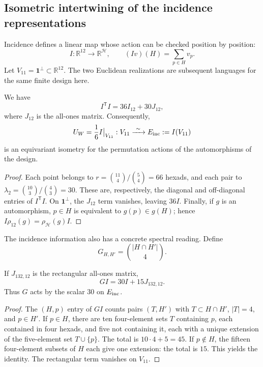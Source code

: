 

\subsection{Isometric intertwining of the incidence representations}
\label{exc:entrelazador}

Incidence defines a linear map whose action can be checked
position by position:
\begin{equation}
 I:\mathbb R^{12}\longrightarrow\mathbb R^{\mathcal H},
 \qquad (Iv)(H)=\sum_{p\in H}v_p.
 \label{exc:incidencia}
\end{equation}
Let $V_{11}=\mathbf1^\perp\subset\mathbb R^{12}$. The two Euclidean
realizations are subsequent languages for the same finite design here.

\begin{proposition}
\label{exc:isometria}
We have
\[
 I^{\mathsf T}I=36I_{12}+30J_{12},
\]
where $J_{12}$ is the all-ones matrix. Consequently,
\[
 U_W=\frac16 I\big|_{V_{11}}:
 V_{11}\xrightarrow{\ \sim\ }E_{\rm inc}:=I(V_{11})
\]
is an equivariant isometry for the permutation actions of the
automorphisms of the design.
\end{proposition}

\begin{proof}
Each point belongs to
$r=\binom{11}{4}/\binom54=66$ hexads, and each pair to
$\lambda_2=\binom{10}{3}/\binom43=30$. These are, respectively, the
diagonal and off-diagonal entries of $I^{\mathsf T}I$. On
$\mathbf1^\perp$, the $J_{12}$ term vanishes, leaving $36I$.
Finally, if $g$ is an automorphism, $p\in H$ is equivalent to
$g(p)\in g(H)$; hence $I\rho_{12}(g)=\rho_{\mathcal H}(g)I$.
\end{proof}

The incidence information also has a concrete spectral
reading. Define
\[
 G_{H,H'}=\binom{|H\cap H'|}{4}.
\]

\begin{lemma}
\label{exc:espectro}
If $J_{132,12}$ is the rectangular all-ones matrix,
\[
 GI=30I+15J_{132,12}.
\]
Thus $G$ acts by the scalar $30$ on $E_{\rm inc}$.
\end{lemma}

\begin{proof}
The $(H,p)$ entry of $GI$ counts pairs $(T,H')$ with
$T\subset H\cap H'$, $|T|=4$, and $p\in H'$. If $p\in H$, there are ten
four-element sets $T$ containing $p$, each contained in four hexads,
and five not containing it, each with a unique extension of the
five-element set $T\cup\{p\}$. The total is $10\cdot4+5=45$.
If $p\notin H$, the fifteen four-element subsets of $H$ each give one extension:
the total is $15$. This yields the identity. The rectangular term
vanishes on $V_{11}$.
\end{proof}

